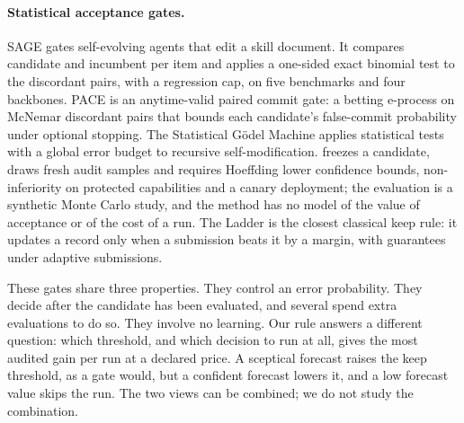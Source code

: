 \paragraph{Statistical acceptance gates.}
SAGE \citep{wang2026sage} gates self-evolving agents that edit a skill document. It compares candidate and incumbent per item and applies a one-sided exact binomial test to the discordant pairs, with a regression cap, on five benchmarks and four backbones. PACE \citep{shawn2026pace} is an anytime-valid paired commit gate: a betting e-process on McNemar discordant pairs that bounds each candidate's false-commit probability under optional stopping. The Statistical G\"odel Machine \citep{sgm2025} applies statistical tests with a global error budget to recursive self-modification. \citet{lonkar2026evidence} freezes a candidate, draws fresh audit samples and requires Hoeffding lower confidence bounds, non-inferiority on protected capabilities and a canary deployment; the evaluation is a synthetic Monte Carlo study, and the method has no model of the value of acceptance or of the cost of a run. The Ladder \citep{blum2015ladder} is the closest classical keep rule: it updates a record only when a submission beats it by a margin, with guarantees under adaptive submissions.

These gates share three properties. They control an error probability. They decide after the candidate has been evaluated, and several spend extra evaluations to do so. They involve no learning. Our rule answers a different question: which threshold, and which decision to run at all, gives the most audited gain per run at a declared price. A sceptical forecast raises the keep threshold, as a gate would, but a confident forecast lowers it, and a low forecast value skips the run. The two views can be combined; we do not study the combination.


